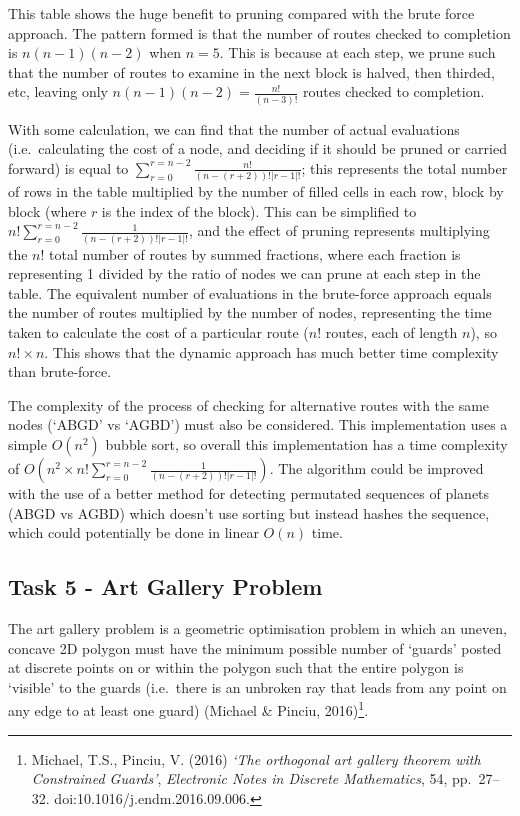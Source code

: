 \documentclass[
]{article}
\begin{document}
This table shows the huge benefit to pruning compared with the brute
force approach. The pattern formed is that the number of routes checked
to completion is \(n(n-1)(n-2)\) when \(n=5\). This is because at each
step, we prune such that the number of routes to examine in the next
block is halved, then thirded, etc, leaving only
\(n(n-1)(n-2)=\frac{n!}{(n-3)!}\) routes checked to completion.

With some calculation, we can find that the number of actual evaluations
(i.e.~calculating the cost of a node, and deciding if it should be
pruned or carried forward) is equal to
\(\sum_{r=0}^{r=n-2} \frac{n!}{(n-(r+2))!|r-1|!}\); this represents the
total number of rows in the table multiplied by the number of filled
cells in each row, block by block (where \(r\) is the index of the
block). This can be simplified to
\(n!\sum_{r=0}^{r=n-2} \frac{1}{(n-(r+2))!|r-1|!}\), and the effect of
pruning represents multiplying the \(n!\) total number of routes by
summed fractions, where each fraction is representing 1 divided by the
ratio of nodes we can prune at each step in the table. The equivalent
number of evaluations in the brute-force approach equals the number of
routes multiplied by the number of nodes, representing the time taken to
calculate the cost of a particular route (\(n!\) routes, each of length
\(n\)), so \(n!\times n\). This shows that the dynamic approach has much
better time complexity than brute-force.

The complexity of the process of checking for alternative routes with
the same nodes (`ABGD' vs `AGBD') must also be considered. This
implementation uses a simple \(O(n^2)\) bubble sort, so overall this
implementation has a time complexity of
\(O(n^2\times n!\sum_{r=0}^{r=n-2} \frac{1}{(n-(r+2))!|r-1|!})\). The
algorithm could be improved with the use of a better method for
detecting permutated sequences of planets (ABGD vs AGBD) which doesn't
use sorting but instead hashes the sequence, which could potentially be
done in linear \(O(n)\) time.

\newpage

\subsection{Task 5 - Art Gallery
Problem}\label{task-5---art-gallery-problem}

The art gallery problem is a geometric optimisation problem in which an
uneven, concave 2D polygon must have the minimum possible number of
`guards' posted at discrete points on or within the polygon such that
the entire polygon is `visible' to the guards (i.e.~there is an unbroken
ray that leads from any point on any edge to at least one guard)
(Michael \& Pinciu, 2016)\footnote{Michael, T.S., Pinciu, V. (2016)
  \emph{`The orthogonal art gallery theorem with Constrained Guards'},
  \emph{Electronic Notes in Discrete Mathematics}, 54, pp.~27--32.
  doi:10.1016/j.endm.2016.09.006.}.
\end{document}

